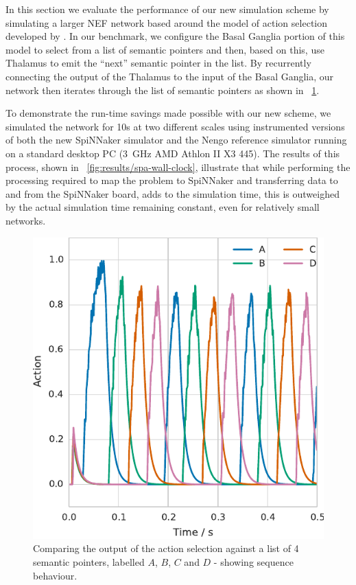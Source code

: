 \documentclass[conference]{IEEEtran}
\begin{document}
In this section we evaluate the performance of our new simulation scheme by simulating a larger NEF network based around the model of action selection developed by \textcite{Stewart2010}. 
In our benchmark, we configure the Basal Ganglia portion of this model to select from a list of semantic pointers and then, based on this, use Thalamus to emit the ``next'' semantic pointer in the list. By recurrently connecting the output of the Thalamus to the input of the Basal Ganglia, our network then iterates through the list of semantic pointers as shown in \figurename~\ref{fig:results/sequence}.

To demonstrate the run-time savings made possible with our new scheme, we simulated the network for 10s at two different scales using instrumented versions of both the new SpiNNaker simulator and the Nengo reference simulator \parencite{Bekolay2014} running on a standard desktop PC (\SI{3}{\giga\hertz} AMD Athlon II X3 445). 
The results of this process, shown in \figurename~\ref{fig:results/spa-wall-clock}, illustrate that while  performing the processing required to map the problem to SpiNNaker and transferring data to and from the SpiNNaker board, adds to the simulation time, this is outweighed by the actual simulation time remaining constant, even for relatively small networks.
 
  \begin{figure}[!t]
    \includegraphics{figures/sequence}
    \caption{Comparing the output of the action selection against a list of 4 semantic pointers, labelled $A$, $B$, $C$ and $D$ - showing sequence behaviour.}
    \label{fig:results/sequence}
  \end{figure}
\end{document}
